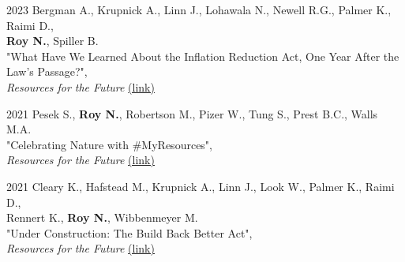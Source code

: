 \documentclass[margin]{res}
\begin{document}
\begin{resume}
2023 \hspace{4mm}%
    Bergman A., Krupnick A., Linn J., Lohawala N., Newell R.G., Palmer K., Raimi D., \\ \hspace*{11mm} \textbf{Roy N.}, Spiller B. \\
    \hspace*{16mm}
    "What Have We Learned About the Inflation Reduction Act, One Year After the \\
    \hspace*{16mm} Law’s Passage?", \\
    \hspace*{16mm} \textit{Resources for the Future} \href{https://www.resources.org/common-resources/what-have-we-learned-about-the-inflation-reduction-act-one-year-after-the-laws-passage/}{(link)} %

2021 \hspace{4mm}%
    Pesek S., \textbf{Roy N.}, Robertson M., Pizer W., Tung S., Prest B.C., Walls M.A. \\
    \hspace*{16mm}
    "Celebrating Nature with \#MyResources", \\
    \hspace*{16mm} \textit{Resources for the Future} \href{https://www.resources.org/archives/celebrating-nature-with-myresources/}{(link)} %

2021 \hspace{4mm}%
    Cleary K., Hafstead M., Krupnick A., Linn J., Look W., Palmer K., Raimi D.,  \\ \hspace*{11mm} Rennert K., \textbf{Roy N.}, Wibbenmeyer M. \\
    \hspace*{16mm}
    "Under Construction: The Build Back Better Act", \\
    \hspace*{16mm} \textit{Resources for the Future} \href{https://www.resources.org/common-resources/under-construction-the-build-back-better-act/}{(link)} %


\end{resume}
\end{document}
